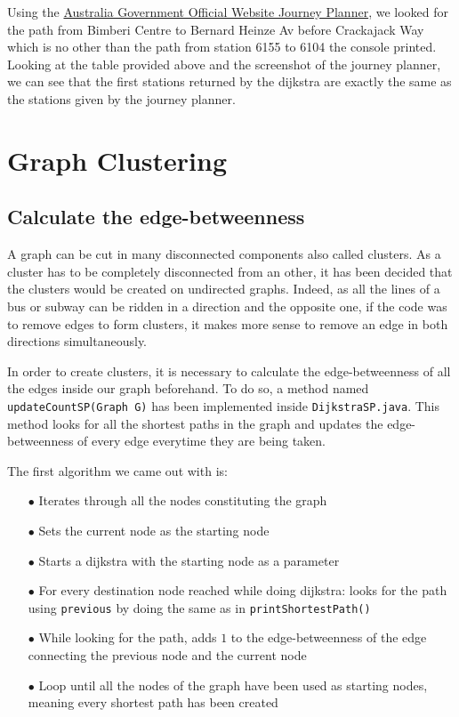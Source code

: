 \documentclass{article}
\begin{document}
Using the \href{https://www.transport.act.gov.au/journey-planner-map?flat=-35.22262&flng=149.15615&fname=Bimberi%20Centre&fid=pt_pub|AU_ACT_Canberra|6155&fsrc=SKEDGO&tlat=-35.157483&tlng=149.117915&tname=Bernard%20Heinze%20Avenue%20before%20Crackajack%20Way,%20Canberra,%20ACT,%20Australia&tid=node/6357446892&tsrc=PELIAS&type=0&time=1610299291}{Australia Government Official Website Journey Planner}, we looked for the path from Bimberi Centre to Bernard Heinze Av before Crackajack Way which is no other than the path from station 6155 to 6104 the console printed. Looking at the table provided above and the screenshot of the journey planner, we can see that the first stations returned by the dijkstra are exactly the same as the stations given by the journey planner.

\newpage

\section{Graph Clustering}

\subsection{Calculate the edge-betweenness}

A graph can be cut in many disconnected components also called clusters. As a cluster has to be completely disconnected from an other, it has been decided that the clusters would be created on undirected graphs. Indeed, as all the lines of a bus or subway can be ridden in a direction and the opposite one, if the code was to remove edges to form clusters, it makes more sense to remove an edge in both directions simultaneously.

In order to create clusters, it is necessary to calculate the edge-betweenness of all the edges inside our graph beforehand. To do so, a method named \texttt{updateCountSP(Graph G)} has been implemented inside \texttt{DijkstraSP.java}. This method looks for all the shortest paths in the graph and updates the edge-betweenness of every edge everytime they are being taken.

The first algorithm we came out with is:

\begin{itemize}
\item[$\bullet$] Iterates through all the nodes constituting the graph
\item[$\bullet$] Sets the current node as the starting node
\item[$\bullet$] Starts a dijkstra with the starting node as a parameter
\item[$\bullet$] For every destination node reached while doing dijkstra: looks for the path using \texttt{previous} by doing the same as in \texttt{printShortestPath()}
\item[$\bullet$] While looking for the path, adds $1$ to the edge-betweenness of the edge connecting the previous node and the current node
\item[$\bullet$] Loop until all the nodes of the graph have been used as starting nodes, meaning every shortest path has been created
\end{itemize}
\end{document}
